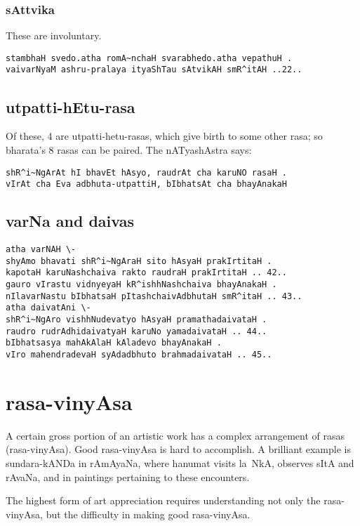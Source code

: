 \documentclass[oneside, article]{memoir}
\begin{document}
\subsubsection{sAttvika}
These are involuntary.

\begin{verbatim}
stambhaH svedo.atha romA~nchaH svarabhedo.atha vepathuH .
vaivarNyaM ashru-pralaya ityaShTau sAtvikAH smR^itAH ..22..
\end{verbatim}



\subsection{utpatti-hEtu-rasa}
Of these, 4 are utpatti-hetu-rasas, which give birth to some other rasa; so bharata's 8 rasas can be paired. The nATyashAstra says:

\begin{verbatim}
shR^i~NgArAt hI bhavEt hAsyo, raudrAt cha karuNO rasaH .
vIrAt cha Eva adbhuta-utpattiH, bIbhatsAt cha bhayAnakaH
\end{verbatim}

\subsection{varNa and daivas}
\begin{verbatim}
atha varNAH \-
shyAmo bhavati shR^i~NgAraH sito hAsyaH prakIrtitaH .
kapotaH karuNashchaiva rakto raudraH prakIrtitaH .. 42..
gauro vIrastu vidnyeyaH kR^ishhNashchaiva bhayAnakaH .
nIlavarNastu bIbhatsaH pItashchaivAdbhutaH smR^itaH .. 43..
atha daivatAni \-
shR^i~NgAro vishhNudevatyo hAsyaH pramathadaivataH .
raudro rudrAdhidaivatyaH karuNo yamadaivataH .. 44..
bIbhatsasya mahAkAlaH kAladevo bhayAnakaH .
vIro mahendradevaH syAdadbhuto brahmadaivataH .. 45..
\end{verbatim}

\section{rasa-vinyAsa}
A certain gross portion of an artistic work has a complex arrangement of rasas (rasa-vinyAsa). Good rasa-vinyAsa is hard to accomplish. A brilliant example is sundara-kANDa in rAmAyaNa, where hanumat visits la~NkA, observes sItA and rAvaNa, and in paintings pertaining to these encounters.

The highest form of art appreciation requires understanding not only the rasa-vinyAsa, but the difficulty in making good rasa-vinyAsa.
\end{document}
